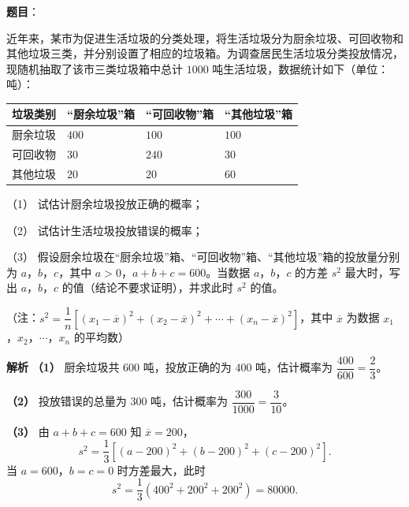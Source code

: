 \begin{answer}

\textbf{题目}：

近年来，某市为促进生活垃圾的分类处理，将生活垃圾分为厨余垃圾、可回收物和其他垃圾三类，并分别设置了相应的垃圾箱。为调查居民生活垃圾分类投放情况，现随机抽取了该市三类垃圾箱中总计 $1000$ 吨生活垃圾，数据统计如下（单位：吨）：

\begin{center}
\begin{tabular}{llll}
\toprule
垃圾类别 & “厨余垃圾”箱 & “可回收物”箱 & “其他垃圾”箱 \\
\midrule
厨余垃圾 & $400$ & $100$ & $100$ \\
可回收物 & $30$ & $240$ & $30$ \\
其他垃圾 & $20$ & $20$ & $60$ \\
\bottomrule
\end{tabular}
\end{center}

（1） 试估计厨余垃圾投放正确的概率；

（2） 试估计生活垃圾投放错误的概率；

（3） 假设厨余垃圾在“厨余垃圾”箱、“可回收物”箱、“其他垃圾”箱的投放量分别为 $a$，$b$，$c$，其中 $a>0$，$a+b+c=600$。当数据 $a$，$b$，$c$ 的方差 $s^2$ 最大时，写出 $a$，$b$，$c$ 的值（结论不要求证明），并求此时 $s^2$ 的值。

（注：$s^2=\dfrac1n\left[(x_1-\overline x)^2+(x_2-\overline x)^2+\cdots+(x_n-\overline x)^2\right]$，其中 $\overline x$ 为数据 $x_1$，$x_2$，$\cdots$，$x_n$ 的平均数）

\textbf{解析}
\textbf{（1）} 厨余垃圾共 $600$ 吨，投放正确的为 $400$ 吨，估计概率为 $\dfrac{400}{600}=\dfrac23$。

\textbf{（2）} 投放错误的总量为 $300$ 吨，估计概率为 $\dfrac{300}{1000}=\dfrac3{10}$。

\textbf{（3）} 由 $a+b+c=600$ 知 $\overline x=200$，
\nopagebreak[4]
\[s^2=\frac13\left[(a-200)^2+(b-200)^2+(c-200)^2\right].\]
当 $a=600$，$b=c=0$ 时方差最大，此时
\nopagebreak[4]
\[s^2=\frac13\left(400^2+200^2+200^2\right)=80000.\]




\end{answer}
